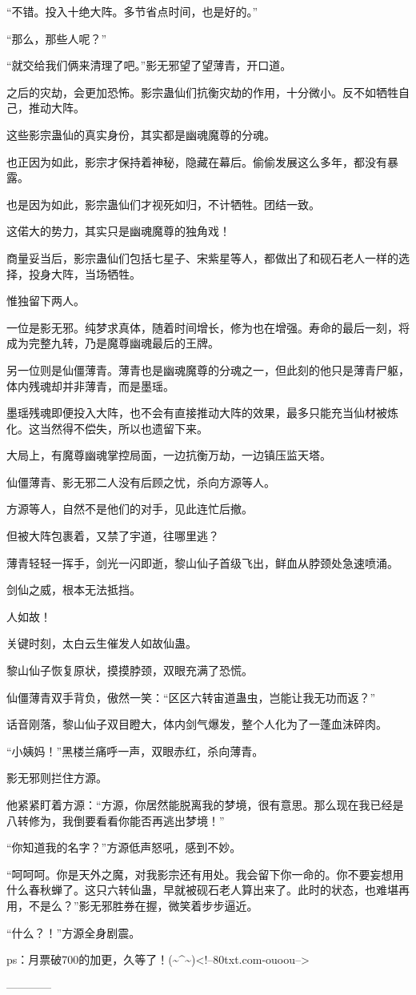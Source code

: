 \begin{this_body}
“不错。投入十绝大阵。多节省点时间，也是好的。”

“那么，那些人呢？”

“就交给我们俩来清理了吧。”影无邪望了望薄青，开口道。

之后的灾劫，会更加恐怖。影宗蛊仙们抗衡灾劫的作用，十分微小。反不如牺牲自己，推动大阵。

这些影宗蛊仙的真实身份，其实都是幽魂魔尊的分魂。

也正因为如此，影宗才保持着神秘，隐藏在幕后。偷偷发展这么多年，都没有暴露。

也是因为如此，影宗蛊仙们才视死如归，不计牺牲。团结一致。

这偌大的势力，其实只是幽魂魔尊的独角戏！

商量妥当后，影宗蛊仙们包括七星子、宋紫星等人，都做出了和砚石老人一样的选择，投身大阵，当场牺牲。

惟独留下两人。

一位是影无邪。纯梦求真体，随着时间增长，修为也在增强。寿命的最后一刻，将成为完整九转，乃是魔尊幽魂最后的王牌。

另一位则是仙僵薄青。薄青也是幽魂魔尊的分魂之一，但此刻的他只是薄青尸躯，体内残魂却并非薄青，而是墨瑶。

墨瑶残魂即便投入大阵，也不会有直接推动大阵的效果，最多只能充当仙材被炼化。这当然得不偿失，所以也遗留下来。

大局上，有魔尊幽魂掌控局面，一边抗衡万劫，一边镇压监天塔。

仙僵薄青、影无邪二人没有后顾之忧，杀向方源等人。

方源等人，自然不是他们的对手，见此连忙后撤。

但被大阵包裹着，又禁了宇道，往哪里逃？

薄青轻轻一挥手，剑光一闪即逝，黎山仙子首级飞出，鲜血从脖颈处急速喷涌。

剑仙之威，根本无法抵挡。

人如故！

关键时刻，太白云生催发人如故仙蛊。

黎山仙子恢复原状，摸摸脖颈，双眼充满了恐慌。

仙僵薄青双手背负，傲然一笑：“区区六转宙道蛊虫，岂能让我无功而返？”

话音刚落，黎山仙子双目瞪大，体内剑气爆发，整个人化为了一蓬血沫碎肉。

“小姨妈！”黑楼兰痛呼一声，双眼赤红，杀向薄青。

影无邪则拦住方源。

他紧紧盯着方源：“方源，你居然能脱离我的梦境，很有意思。那么现在我已经是八转修为，我倒要看看你能否再逃出梦境！”

“你知道我的名字？”方源低声怒吼，感到不妙。

“呵呵呵。你是天外之魔，对我影宗还有用处。我会留下你一命的。你不要妄想用什么春秋蝉了。这只六转仙蛊，早就被砚石老人算出来了。此时的状态，也难堪再用，不是么？”影无邪胜券在握，微笑着步步逼近。

“什么？！”方源全身剧震。

ps：月票破700的加更，久等了！(\~{}\^{}\~{})<!--80txt.com-ouoou-->

------------

\end{this_body}

